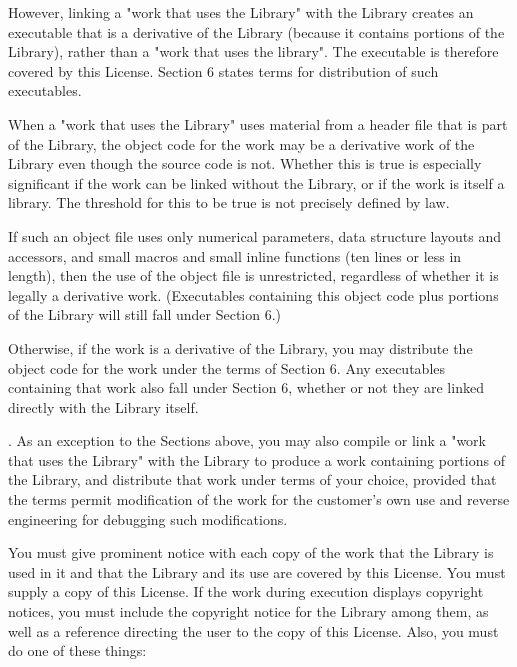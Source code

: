However, linking a "work that uses the Library" with the Library creates an executable that is a derivative of the Library (because it contains portions of the Library), rather than a "work that uses the library". The executable is therefore covered by this License. Section 6 states terms for distribution of such executables. 

When a "work that uses the Library" uses material from a header file that is part of the Library, the object code for the work may be a derivative work of the Library even though the source code is not. Whether this is true is especially significant if the work can be linked without the Library, or if the work is itself a library. The threshold for this to be true is not precisely defined by law. 

If such an object file uses only numerical parameters, data structure layouts and accessors, and small macros and small inline functions (ten lines or less in length), then the use of the object file is unrestricted, regardless of whether it is legally a derivative work. (Executables containing this object code plus portions of the Library will still fall under Section 6.) 

Otherwise, if the work is a derivative of the Library, you may distribute the object code for the work under the terms of Section 6. Any executables containing that work also fall under Section 6, whether or not they are linked directly with the Library itself. 

. As an exception to the Sections above, you may also compile or link a "work that uses the Library" with the Library to produce a work containing portions of the Library, and distribute that work under terms of your choice, provided that the terms permit modification of the work for the customer's own use and reverse engineering for debugging such modifications. 

You must give prominent notice with each copy of the work that the Library is used in it and that the Library and its use are covered by this License. You must supply a copy of this License. If the work during execution displays copyright notices, you must include the copyright notice for the Library among them, as well as a reference directing the user to the copy of this License. Also, you must do one of these things: 

